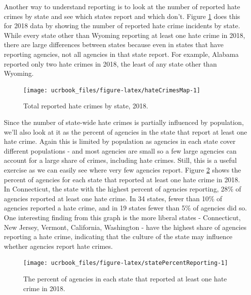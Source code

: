\documentclass[
  12pt,
  openany]{book}
\begin{document}
Another way to understand reporting is to look at the number of reported hate crimes by state and see which states report and which don't. Figure \ref{fig:hateCrimesMap} does this for 2018 data by showing the number of reported hate crime incidents by state. While every state other than Wyoming reporting at least one hate crime in 2018, there are large differences between states because even in states that have reporting agencies, not all agencies in that state report. For example, Alabama reported only two hate crimes in 2018, the least of any state other than Wyoming.

\begin{figure}

{\centering \texttt{[image: ucrbook\_files/figure-latex/hateCrimesMap-1]} 

}

\caption{Total reported hate crimes by state, 2018.}\label{fig:hateCrimesMap}
\end{figure}

Since the number of state-wide hate crimes is partially influenced by population, we'll also look at it as the percent of agencies in the state that report at least one hate crime. Again this is limited by population as agencies in each state cover different populations - and most agencies are small so a few large agencies can account for a large share of crimes, including hate crimes. Still, this is a useful exercise as we can easily see where very few agencies report. Figure \ref{fig:statePercentReporting} shows the percent of agencies for each state that reported at least one hate crime in 2018. In Connecticut, the state with the highest percent of agencies reporting, 28\% of agencies reported at least one hate crime. In 34 states, fewer than 10\% of agencies reported a hate crime, and in 19 states fewer than 5\% of agencies did so. One interesting finding from this graph is the more liberal states - Connecticut, New Jersey, Vermont, California, Washington - have the highest share of agencies reporting a hate crime, indicating that the culture of the state may influence whether agencies report hate crimes.

\begin{figure}

{\centering \texttt{[image: ucrbook\_files/figure-latex/statePercentReporting-1]} 

}

\caption{The percent of agencies in each state that reported at least one hate crime in 2018.}\label{fig:statePercentReporting}
\end{figure}
\end{document}
